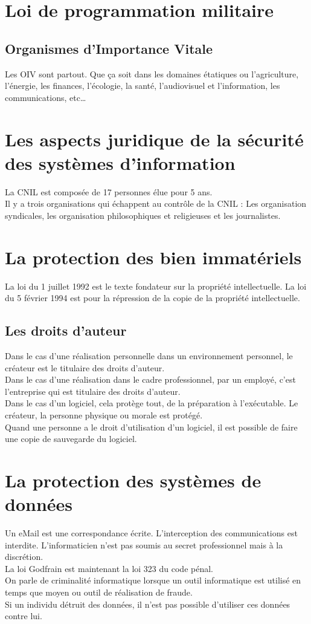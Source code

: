 \section{Loi de programmation militaire}
\subsection{Organismes d'Importance Vitale}
Les OIV sont partout. Que ça soit dans les domaines étatiques ou l'agriculture, l'énergie, les finances, l'écologie, la santé, l'audiovisuel et l'information, les communications, etc\ldots
\section{Les aspects juridique de la sécurité des systèmes d'information}
La CNIL est composée de 17 personnes élue pour 5 ans.\\
Il y a trois organisations qui échappent au contrôle de la CNIL : Les organisation syndicales, les organisation philosophiques et religieuses et les journalistes.
\section{La protection des bien immatériels}
La loi du 1 juillet 1992 est le texte fondateur sur la propriété intellectuelle. La loi du 5 février 1994 est pour la répression de la copie de la propriété intellectuelle.
\subsection{Les droits d'auteur}
Dans le cas d'une réalisation personnelle dans un environnement personnel, le créateur est le titulaire des droits d'auteur.\\
Dans le cas d'une réalisation dans le cadre professionnel, par un employé, c'est l'entreprise qui est titulaire des droits d'auteur.\\
Dans le cas d'un logiciel, cela protège tout, de la préparation à l'exécutable. Le créateur, la personne physique ou morale est protégé.\\
Quand une personne a le droit d'utilisation d'un logiciel, il est possible de faire une copie de sauvegarde du logiciel.
\section{La protection des systèmes de données}
Un eMail est une correspondance écrite. L'interception des communications est interdite. L'informaticien n'est pas soumis au secret professionnel mais à la discrétion.\\
La loi Godfrain est maintenant la loi 323 du code pénal.\\
On parle de criminalité informatique lorsque un outil informatique est utilisé en temps que moyen ou outil de réalisation de fraude.\\
Si un individu détruit des données, il n'est pas possible d'utiliser ces données contre lui.

